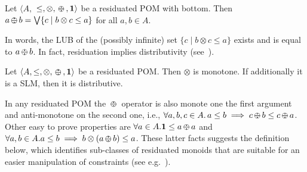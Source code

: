 \documentclass{llncs}
\def\1{{\mathbf 1}}
\newcommand{\shortNoProof}[1]{ }
\def\monid{{\mathbf 0}}
\def\1{{\mathbf 1}}
\def\monop{\otimes}
\def\odiv{\, {\ominus\hspace{-7.7pt} \div} \,}
\def\monid{\mathbf{1}}
\begin{document}
\begin{lemma}\label{rclm1}
	Let $\langle A,$ $\leq, \otimes,  \odiv, \1 \rangle$ be a residuated POM with bottom.
	Then $a \odiv b = \bigvee \{c \mid b \otimes c \leq a\}$ for all $a, b \in A$.
\end{lemma}

In words, the LUB of the (possibly infinite) set 
$\{c \mid b \otimes c \leq a\}$ exists and is equal to $a \odiv b$.
%
In fact, residuation implies distributivity (see~\cite[Lemma 2.2]{ipl17}).

\begin{lemma}\label{rclm2}
	Let $\langle A, \leq, \monop, \odiv, \1 \rangle$ be a residuated POM. 
	Then $\monop$ is monotone.
	If additionally it is a SLM, then it is distributive.
\end{lemma}

\shortNoProof{
\begin{proof}
	By definition $a \odiv b$ is an upper bound of 
	$\{ c \mid b \monop c \leq a\}$ and $b \monop (a \odiv b) \leq a$.
\qed
\end{proof}
}



In any residuated POM the $\odiv$ operator is also monote one the first argument and 
anti-monotone on the second one, i.e., 
$\forall a, b, c \in A.\, a\leq b \implies  c\odiv b \leq c \odiv a$.
%
Other easy to prove properties are
$\forall a\in A. \monid \leq a \odiv a$ and
$\forall a, b \in A. a \leq b \implies b \monop (a \odiv b) \leq a$.
%
%
%
%
%
These latter facts suggests the definition below, which identifies sub-classes 
of residuated monoids that are suitable for an easier manipulation
of constraints (see e.g.~\cite{ecai06}).
\end{document}
